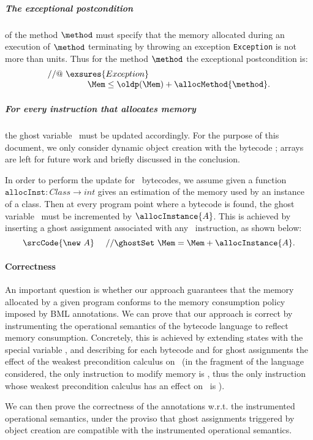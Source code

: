 \subparagraph{The exceptional postcondition} of the method $\method$ must
specify that the memory allocated during an execution of $\method$ 
terminating by throwing an exception \texttt{Exception} is not more
than \allocMethod{\method} units. Thus for the method $\method$ the
exceptional postcondition is:
$$
\begin{array}{l}
//@ \ \exsures{Exception} \\
\ \ \ \ \ \ \ \ \ \ \ \ \ \  \Mem \leq \oldp(\Mem) + \allocMethod{\method}.
\end{array}
$$




\subparagraph{For every instruction that allocates memory} the ghost
variable \Mem\ must be updated accordingly. For the purpose of
this document, we only consider dynamic object creation with the 
bytecode \new; arrays are left for future work and briefly discussed 
in the conclusion. 

In order to perform the update for \new\ bytecodes, we assume given a
function $\texttt{allocInst}: Class \rightarrow int$ gives an
estimation of the memory used by an instance of a class. Then at every
program point where a bytecode  is found, the ghost
variable \Mem\ must be incremented by $\allocInstance{A}$. This is
achieved by inserting a ghost assignment associated with any \new\
instruction, as shown below:
$$
\srcCode{\new \ A} \ \ \ \ // \ghostSet \ \Mem = \Mem + \allocInstance{A}.
$$

\paragraph{Correctness} An important question is whether our approach
guarantees that the memory allocated by a given program conforms to
the memory consumption policy imposed by BML annotations. We can
prove that our approach is correct by instrumenting the operational
semantics of the bytecode language to reflect memory
consumption. Concretely, this is achieved by extending states with the
special variable \Mem, and describing for each bytecode and for ghost
assignments the effect of the weakest precondition calculus on \Mem\
(in the fragment of the language considered, the only instruction to
modify memory is \new, thus the only instruction whose weakest
precondition calculus has an effect on \Mem\ is \new).

We can then prove the correctness of the annotations w.r.t. the
instrumented operational semantics, under the proviso that ghost
assignments triggered by object creation are compatible with the
instrumented operational semantics. 


